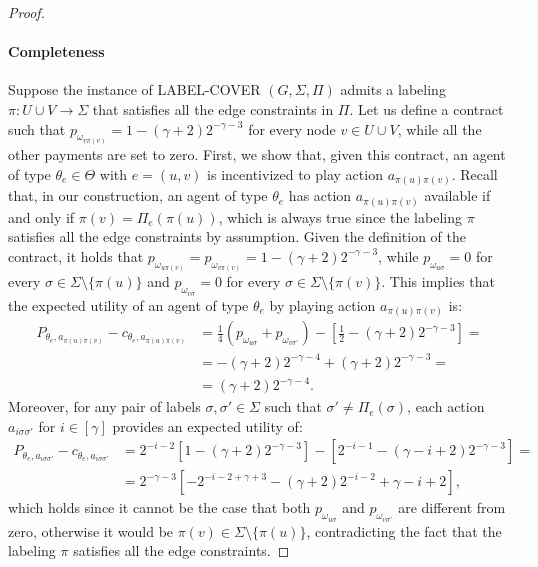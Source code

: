 \begin{proof}
	\paragraph{Completeness}
	Suppose the instance of \textsf{LABEL-COVER} $(G,\Sigma,\Pi)$ admits a labeling $\pi : U \cup V \to \Sigma$ that satisfies all the edge constraints in $\Pi$.
	Let us define a contract such that $p_{\omega_{v \pi(v)}} = 1-(\gamma+2) 2^{-\gamma-3}$ for every node $v \in U \cup V$, while all the other payments are set to zero.
	First, we show that, given this contract, an agent of type $\theta_{e} \in \Theta$ with $e= (u,v)$ is incentivized to play action $a_{\pi(u) \pi(v)}$.
	Recall that, in our construction, an agent of type $\theta_{e}$ has action $a_{\pi(u) \pi(v)}$ available if and only if $\pi(v) = \Pi_e(\pi(u))$, which is always true since the labeling $\pi$ satisfies all the edge constraints by assumption.
	Given the definition of the contract, it holds that $p_{\omega_{u \pi(v)}} = p_{\omega_{v \pi(v)}} = 1-(\gamma+2) 2^{-\gamma-3}$, while $p_{\omega_{u \sigma}} = 0$ for every $\sigma \in \Sigma \setminus \{ \pi(u) \}$ and $p_{\omega_{v \sigma}} = 0$ for every $\sigma \in \Sigma \setminus \{ \pi(v) \}$.
	This implies that the expected utility of an agent of type $\theta_{e}$ by playing action $a_{\pi(u) \pi(v)}$ is:
	\begin{align*}
		P_{\theta_{e}, a_{\pi(u) \pi(v)}} - c_{\theta_e, a_{\pi(u) \pi(v)}} & =\frac{1}{4} \left( p_{\omega_{u\sigma}} +p_{\omega_{v\sigma'}} \right) - \left[ \frac{1}{2}- (\gamma+2) 2^{-\gamma-3} \right]= \\
		& =-(\gamma+2) 2^{-\gamma-4} +(\gamma+2)2^{-\gamma-3}= \\
		& =(\gamma+2) 2^{-\gamma-4}.
	\end{align*}
	Moreover, for any pair of labels $\sigma, \sigma' \in \Sigma$ such that $ \sigma' \neq  \Pi_e(\sigma) $, each action $a_{i \sigma \sigma'}$ for $i \in [\gamma]$ provides an expected utility of:
	\begin{align*}
		P_{\theta_{e}, a_{i \sigma \sigma'}} - c_{\theta_e, a_{i \sigma\sigma'}} & =2^{-i-2} \left[ 1-(\gamma+2) 2^{-\gamma-3} \right] - \left[ 2^{-i-1}-(\gamma-i+2)2^{-\gamma-3} \right]= \\
		& = 2^{-\gamma-3} \left[ -2^{-i-2+\gamma+3}-(\gamma+2) 2^{-i-2}+ \gamma-i+2 \right] ,
	\end{align*}
	which holds since it cannot be the case that both $p_{\omega_{u \sigma}}$ and $p_{\omega_{v \sigma'}}$ are different from zero, otherwise it would be $\pi(v) \in \Sigma \setminus \{ \pi(u) \}$, contradicting the fact that the labeling $\pi$ satisfies all the edge constraints.

\end{proof}

